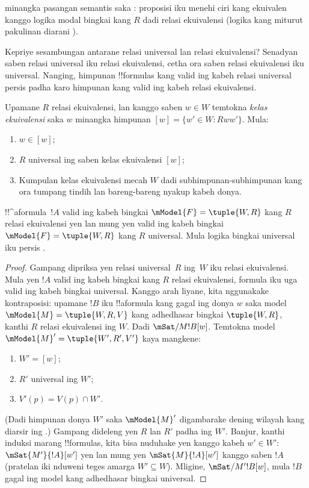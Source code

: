 \documentclass[../../../include/open-logic-section]{subfiles}
\begin{document}
 minangka pasangan semantis saka
: proposisi iku menehi ciri kang ekuivalen
kanggo logika modal bingkai kang $R$ dadi relasi ekuivalensi (logika
kang miturut pakulinan diarani ).

Kepriye sesambungan antarane relasi universal lan relasi
ekuivalensi? Senadyan saben relasi universal iku relasi ekuivalensi,
cetha ora saben relasi ekuivalensi iku universal. Nanging, himpunan
!!{formula}s kang valid ing kabeh relasi universal persis padha karo
himpunan kang valid ing kabeh relasi ekuivalensi.

\begin{prop}
  Upamane $R$ relasi ekuivalensi, lan kanggo saben $w \in W$ temtokna
  \emph{kelas ekuivalensi} saka $w$ minangka himpunan $[w] = \{w'\in W :
  Rww'\}$. Mula:
  \begin{enumerate}
  \item $w \in [w]$;
  \item $R$ universal ing saben kelas ekuivalensi $[w]$;
  \item Kumpulan kelas ekuivalensi mecah $W$ dadi subhimpunan-subhimpunan
    kang ora tumpang tindih lan bareng-bareng nyakup kabeh donya.
  \end{enumerate}
\end{prop}

\begin{prop}
  !!^a{formula}~$!A$ valid ing kabeh bingkai $\mModel{F} =\tuple{W,R}$
  kang $R$ relasi ekuivalensi yen lan mung yen valid ing kabeh bingkai
  $\mModel{F} =\tuple{W,R}$ kang $R$ universal. Mula logika bingkai
  universal iku persis .
\end{prop}

\begin{proof}
  Gampang dipriksa yen relasi universal~$R$ ing~$W$ iku relasi
  ekuivalensi. Mula yen $!A$ valid ing kabeh bingkai kang $R$ relasi
  ekuivalensi, formula iku uga valid ing kabeh bingkai universal. Kanggo arah
  liyane, kita nggunakake kontraposisi: upamane $!B$ iku !!a{formula}
  kang gagal ing donya $w$ saka model $\mModel{M} = \tuple{W, R, V}$
  kang adhedhasar bingkai $\tuple{W,R}$, kanthi $R$ relasi ekuivalensi
  ing $W$. Dadi $\mSat/{M}{!B}[w]$. Temtokna model $\mModel{M}' =
  \tuple{W', R', V'}$ kaya mangkene:
  \begin{enumerate}
  \item $W' = [w]$;
  \item $R'$ universal ing $W'$;
  \item $V'(p) = V(p) \cap W'$.
  \end{enumerate}
  (Dadi himpunan donya $W'$ saka $\mModel{M}'$ digambarake dening
  wilayah kang diarsir ing .) Gampang dideleng
  yen $R$ lan $R'$ padha ing $W'$. Banjur, kanthi induksi marang
  !!{formula}s, kita bisa nuduhake yen kanggo kabeh $w' \in W'$:
  $\mSat{M'}{!A}[w']$ yen lan mung yen $\mSat{M}{!A}[w']$ kanggo
  saben $!A$ (pratelan iki nduweni teges amarga $W' \subseteq W$). Mligine,
  $\mSat/{M'}{!B}[w]$, mula $!B$ gagal ing model kang adhedhasar
  bingkai universal.
\end{proof}
\end{document}
